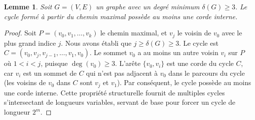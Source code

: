 \documentclass[11pt,a4paper]{article}
\newtheorem{lemma}[theorem]{Lemme}
\begin{document}
\begin{lemma}
Soit $G = (V, E)$ un graphe avec un degr\'e minimum $\delta(G) \ge 3$. Le cycle form\'e \`a partir du chemin maximal poss\`ede au moins une corde interne.
\end{lemma}

\begin{proof}
Soit $P = (v_0, v_1, \dots, v_k)$ le chemin maximal, et $v_j$ le voisin de $v_0$ avec le plus grand indice $j$. Nous avons \'etabli que $j \ge \delta(G) \ge 3$. Le cycle est $C = (v_0, v_j, v_{j-1}, \dots, v_1, v_0)$.
Le sommet $v_0$ a au moins un autre voisin $v_i$ sur $P$ o\`u $1 < i < j$, puisque $\deg(v_0) \ge 3$. L'ar\^ete $\{v_0, v_i\}$ est une corde du cycle $C$, car $v_i$ est un sommet de $C$ qui n'est pas adjacent \`a $v_0$ dans le parcours du cycle (les voisins de $v_0$ dans $C$ sont $v_j$ et $v_1$). Par cons\'equent, le cycle poss\`ede au moins une corde interne. Cette propri\'et\'e structurelle fournit de multiples cycles s'intersectant de longueurs variables, servant de base pour forcer un cycle de longueur $2^m$.
\end{proof}
\end{document}
